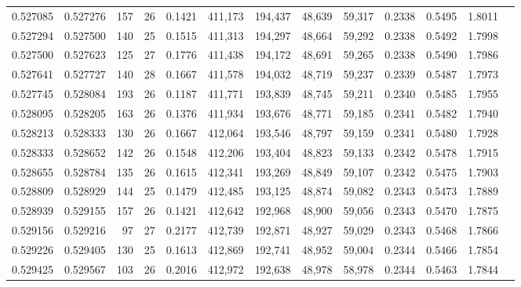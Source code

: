 \begin{tabular}{rrrrrrrrrrrrr}
0.527085 & 0.527276 &    157 &    26 &                                     0.1421 & 411,173 & 194,437 &  48,639 &  59,317 & 0.2338 & 0.5495 & 1.8011 \\
0.527294 & 0.527500 &    140 &    25 &                                     0.1515 & 411,313 & 194,297 &  48,664 &  59,292 & 0.2338 & 0.5492 & 1.7998 \\
0.527500 & 0.527623 &    125 &    27 &                                     0.1776 & 411,438 & 194,172 &  48,691 &  59,265 & 0.2338 & 0.5490 & 1.7986 \\
0.527641 & 0.527727 &    140 &    28 &                                     0.1667 & 411,578 & 194,032 &  48,719 &  59,237 & 0.2339 & 0.5487 & 1.7973 \\
0.527745 & 0.528084 &    193 &    26 &                                     0.1187 & 411,771 & 193,839 &  48,745 &  59,211 & 0.2340 & 0.5485 & 1.7955 \\
0.528095 & 0.528205 &    163 &    26 &                                     0.1376 & 411,934 & 193,676 &  48,771 &  59,185 & 0.2341 & 0.5482 & 1.7940 \\
0.528213 & 0.528333 &    130 &    26 &                                     0.1667 & 412,064 & 193,546 &  48,797 &  59,159 & 0.2341 & 0.5480 & 1.7928 \\
0.528333 & 0.528652 &    142 &    26 &                                     0.1548 & 412,206 & 193,404 &  48,823 &  59,133 & 0.2342 & 0.5478 & 1.7915 \\
0.528655 & 0.528784 &    135 &    26 &                                     0.1615 & 412,341 & 193,269 &  48,849 &  59,107 & 0.2342 & 0.5475 & 1.7903 \\
0.528809 & 0.528929 &    144 &    25 &                                     0.1479 & 412,485 & 193,125 &  48,874 &  59,082 & 0.2343 & 0.5473 & 1.7889 \\
0.528939 & 0.529155 &    157 &    26 &                                     0.1421 & 412,642 & 192,968 &  48,900 &  59,056 & 0.2343 & 0.5470 & 1.7875 \\
0.529156 & 0.529216 &     97 &    27 &                                     0.2177 & 412,739 & 192,871 &  48,927 &  59,029 & 0.2343 & 0.5468 & 1.7866 \\
0.529226 & 0.529405 &    130 &    25 &                                     0.1613 & 412,869 & 192,741 &  48,952 &  59,004 & 0.2344 & 0.5466 & 1.7854 \\
0.529425 & 0.529567 &    103 &    26 &                                     0.2016 & 412,972 & 192,638 &  48,978 &  58,978 & 0.2344 & 0.5463 & 1.7844 \\

\end{tabular}

